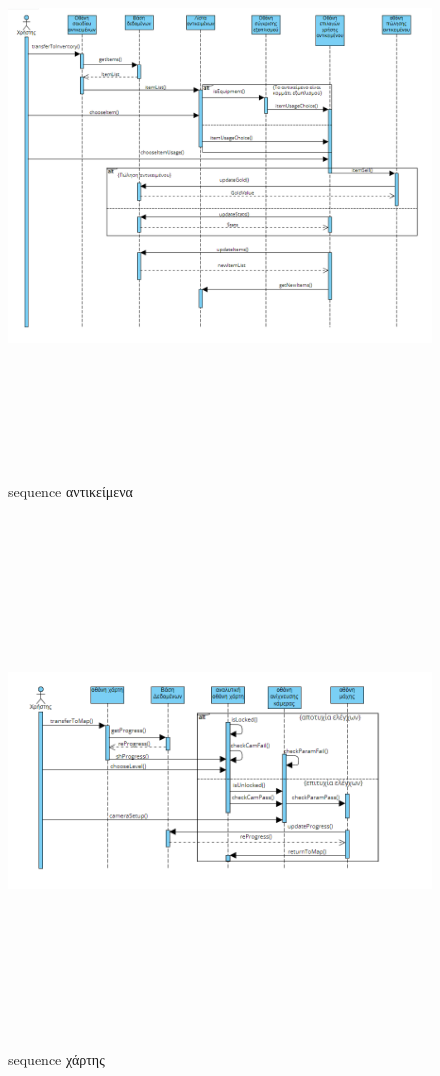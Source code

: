 \begin{figure}[!htb]
  \centering
    \centering
    \includegraphics[width=\textwidth,height=16cm]{sequence_items.png}
    \caption{sequence αντικείμενα}
    \label{}
\end{figure}
\begin{figure}[!htb]
  \centering
    \centering
    \includegraphics[width=\textwidth,height=14cm]{sequence_map.png}
    \caption{sequence χάρτης}
    \label{}
\end{figure}
